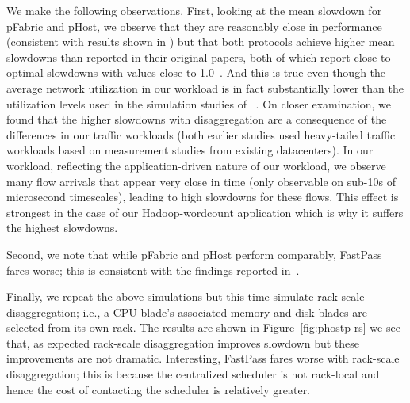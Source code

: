 We make the following observations. 
First, looking at the mean slowdown for pFabric and pHost, we observe that they are reasonably close in performance (consistent with results shown in \cite{phost}) but that both protocols achieve higher mean slowdowns than reported 
in their original papers, both of which report close-to-optimal slowdowns with values close to 1.0~\cite{phost,pfabric}. And this is true even though the average network utilization in our \dis workload is in fact substantially lower than the utilization levels used in the simulation studies of ~\cite{pfabric, phost}. 
On closer examination, we found that the higher slowdowns with disaggregation are a consequence of the differences in our traffic workloads (both earlier studies used heavy-tailed traffic workloads based on measurement 
studies from existing datacenters). In our \dis workload, reflecting the 
application-driven nature of our workload, we observe many flow arrivals that 
appear very close in time (only observable on sub-10s of microsecond timescales), leading to high slowdowns for these flows. This effect is strongest in the case of our 
Hadoop-wordcount application which is why it suffers the highest slowdowns. 

Second, we note that while pFabric and pHost perform comparably, FastPass fares worse; this is consistent with the findings reported in~\cite{phost}.

Finally, we  repeat the above simulations but this time simulate rack-scale 
disaggregation; i.e., a CPU blade's associated memory and disk blades are selected from 
its own rack. The results are shown in Figure~\ref{fig:phostp-rs}  we see that, as expected rack-scale disaggregation improves slowdown but these improvements 
are not dramatic. Interesting, FastPass fares worse with rack-scale disaggregation; this is because the centralized scheduler is not rack-local and hence the cost of contacting 
the scheduler is relatively greater. 





